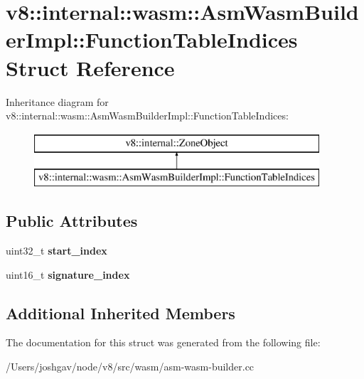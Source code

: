 \hypertarget{structv8_1_1internal_1_1wasm_1_1_asm_wasm_builder_impl_1_1_function_table_indices}{}\section{v8\+:\+:internal\+:\+:wasm\+:\+:Asm\+Wasm\+Builder\+Impl\+:\+:Function\+Table\+Indices Struct Reference}
\label{structv8_1_1internal_1_1wasm_1_1_asm_wasm_builder_impl_1_1_function_table_indices}
Inheritance diagram for v8\+:\+:internal\+:\+:wasm\+:\+:Asm\+Wasm\+Builder\+Impl\+:\+:Function\+Table\+Indices\+:\begin{figure}[H]
\begin{center}
\leavevmode
\includegraphics[height=2.000000cm]{structv8_1_1internal_1_1wasm_1_1_asm_wasm_builder_impl_1_1_function_table_indices}
\end{center}
\end{figure}
\subsection*{Public Attributes}
\begin{DoxyCompactItemize}
\item 
uint32\+\_\+t {\bfseries start\+\_\+index}\hypertarget{structv8_1_1internal_1_1wasm_1_1_asm_wasm_builder_impl_1_1_function_table_indices_a44b897da7903b63adc214496acf532e8}{}\label{structv8_1_1internal_1_1wasm_1_1_asm_wasm_builder_impl_1_1_function_table_indices_a44b897da7903b63adc214496acf532e8}

\item 
uint16\+\_\+t {\bfseries signature\+\_\+index}\hypertarget{structv8_1_1internal_1_1wasm_1_1_asm_wasm_builder_impl_1_1_function_table_indices_a951e83d55cb8692647dfa4209f0955a6}{}\label{structv8_1_1internal_1_1wasm_1_1_asm_wasm_builder_impl_1_1_function_table_indices_a951e83d55cb8692647dfa4209f0955a6}

\end{DoxyCompactItemize}
\subsection*{Additional Inherited Members}


The documentation for this struct was generated from the following file\+:\begin{DoxyCompactItemize}
\item 
/\+Users/joshgav/node/v8/src/wasm/asm-\/wasm-\/builder.\+cc\end{DoxyCompactItemize}
